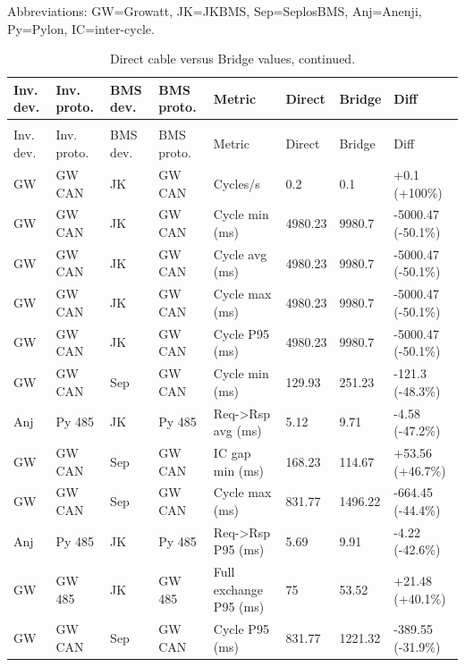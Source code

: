 \documentclass[11pt,a4paper]{article}
\newcommand{\increase}[1]{\textcolor{increasecolor}{#1}}
\newcommand{\decrease}[1]{\textcolor{decreasecolor}{#1}}
\begin{document}
\begin{landscape}
\begingroup
\setlength{\tabcolsep}{3pt}
\setlength{\LTleft}{\fill}
\setlength{\LTright}{\fill}
\setlength{\LTpre}{0.45em}
\setlength{\LTpost}{0.65em}
\small Abbreviations: GW=Growatt, JK=JKBMS, Sep=SeplosBMS, Anj=Anenji, Py=Pylon, IC=inter-cycle.

\begin{longtable}{@{}L{1.6cm}L{2.2cm}L{1.5cm}L{2.2cm}L{5.0cm}L{1.4cm}L{1.4cm}L{3.7cm}@{}}
\caption{Direct cable versus Bridge values, sorted by absolute percentage difference.}\\
\toprule
Inv. dev. & Inv. proto. & BMS dev. & BMS proto. & Metric & Direct & Bridge & Diff \\
\midrule
\endfirsthead
\caption[]{Direct cable versus Bridge values, continued.}\\
\toprule
Inv. dev. & Inv. proto. & BMS dev. & BMS proto. & Metric & Direct & Bridge & Diff \\
\midrule
\endhead
GW & GW CAN & JK & GW CAN & Cycles/s & 0.2 & 0.1 & \increase{+0.1 (+100\%)} \\
GW & GW CAN & JK & GW CAN & Cycle min (ms) & 4980.23 & 9980.7 & \decrease{-5000.47 (-50.1\%)} \\
GW & GW CAN & JK & GW CAN & Cycle avg (ms) & 4980.23 & 9980.7 & \decrease{-5000.47 (-50.1\%)} \\
GW & GW CAN & JK & GW CAN & Cycle max (ms) & 4980.23 & 9980.7 & \decrease{-5000.47 (-50.1\%)} \\
GW & GW CAN & JK & GW CAN & Cycle P95 (ms) & 4980.23 & 9980.7 & \decrease{-5000.47 (-50.1\%)} \\
GW & GW CAN & Sep & GW CAN & Cycle min (ms) & 129.93 & 251.23 & \decrease{-121.3 (-48.3\%)} \\
Anj & Py 485 & JK & Py 485 & Req->Rsp avg (ms) & 5.12 & 9.71 & \decrease{-4.58 (-47.2\%)} \\
GW & GW CAN & Sep & GW CAN & IC gap min (ms) & 168.23 & 114.67 & \increase{+53.56 (+46.7\%)} \\
GW & GW CAN & Sep & GW CAN & Cycle max (ms) & 831.77 & 1496.22 & \decrease{-664.45 (-44.4\%)} \\
Anj & Py 485 & JK & Py 485 & Req->Rsp P95 (ms) & 5.69 & 9.91 & \decrease{-4.22 (-42.6\%)} \\
GW & GW 485 & JK & GW 485 & Full exchange P95 (ms) & 75 & 53.52 & \increase{+21.48 (+40.1\%)} \\
GW & GW CAN & Sep & GW CAN & Cycle P95 (ms) & 831.77 & 1221.32 & \decrease{-389.55 (-31.9\%)} \\

\end{longtable}
\end{landscape}
\end{document}
